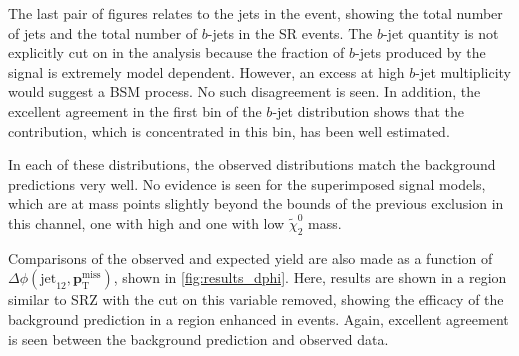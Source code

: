 The last pair of figures relates to the jets in the event, showing the total number of jets and the total number of $b$-jets in the \ac{SR} events. The $b$-jet quantity is not explicitly cut on in the analysis because the fraction of $b$-jets produced by the signal is extremely model dependent. However, an excess at high $b$-jet multiplicity would suggest a \ac{BSM} process. No such disagreement is seen. In addition, the excellent agreement in the first bin of the $b$-jet distribution shows that the \dyjets contribution, which is concentrated in this bin, has been well estimated.

In each of these distributions, the observed distributions match the background predictions very well. No evidence is seen for the superimposed signal models, which are at mass points slightly beyond the bounds of the previous exclusion in this channel, one with high and one with low $\tilde{\chi}^{0}_{2}$ mass.


Comparisons of the observed and expected yield are also made as a function of $\Delta\phi(\text{jet}_{12},{\boldsymbol p}_{\mathrm{T}}^\mathrm{miss})$, shown in \autoref{fig:results_dphi}. Here, results are shown in a region similar to SRZ with the cut on this variable removed, showing the efficacy of the background prediction in a region enhanced in \dyjets events. Again, excellent agreement is seen between the background prediction and observed data.

